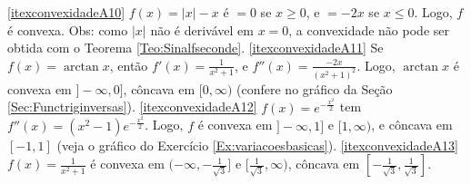\begin{Solution}{6.48}
\begin{center}
\begin{bmlimage}
\end{bmlimage}
\end{center}
\eqref{itexconvexidadeA10} $f(x)=|x|-x$ é $=0$ se $x\geq 0$, e $=-2x$ se
$x\leq 0$. Logo, $f$ é convexa. Obs: como $|x|$ não é derivável em $x=0$, a
convexidade não pode ser obtida com o Teorema \ref{Teo:Sinalfseconde}.
\eqref{itexconvexidadeA11} Se $f(x)=\arctan x$, então $f'(x)=\frac{1}{x^2+1}$,
e $f''(x)=\frac{-2x}{(x^2+1)^2}$. Logo, $\arctan x$ é convexa em $]-\infty,0]$,
côncava em $[0,\infty)$ (confere no gráfico da Seção
\ref{Sec:Functriginversas}).
\eqref{itexconvexidadeA12} $f(x)=e^{-\frac{x^2}{2}}$ tem
$f''(x)=(x^2-1)e^{-\frac{x^2}{2}}$. Logo, $f$ é convexa em $]-\infty,1]$ e
$[1,\infty)$, e côncava em $[-1,1]$ (veja o gráfico do Exercício
\ref{Ex:variacoesbasicas}).
\eqref{itexconvexidadeA13} $f(x)=\frac{1}{x^2+1}$ é convexa em
$(-\infty,-\frac{1}{\sqrt{3}}]$ e $[\frac{1}{\sqrt{3}},\infty)$, côncava em
$[-\frac{1}{\sqrt{3}},\frac{1}{\sqrt{3}}]$.
\begin{center}
\begin{bmlimage}\end{bmlimage}
\end{center}
\end{Solution}
